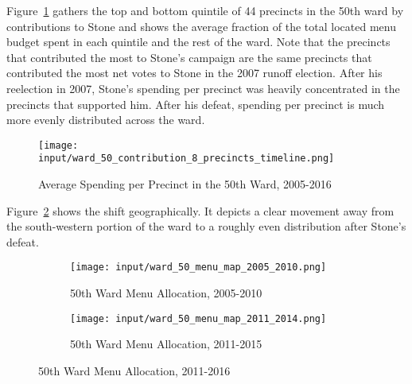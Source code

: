 Figure~\ref{fig:stone_spending_timeline} gathers the top and bottom quintile of 44 precincts in the 50th ward by contributions to Stone and shows the average fraction of the total located menu budget spent in each quintile and the rest of the ward.
Note that the precincts that contributed the most to Stone's campaign are the same precincts that contributed the most net votes to Stone in the 2007 runoff election.
After his reelection in 2007, Stone's spending per precinct was heavily concentrated in the precincts that supported him.
After his defeat, spending per precinct is much more evenly distributed across the ward.

\begin{figure}[H]
    \centering
    \texttt{[image: input/ward\_50\_contribution\_8\_precincts\_timeline.png]}
    \caption{Average Spending per Precinct in the 50th Ward, 2005-2016}
    \label{fig:stone_spending_timeline}
\end{figure}

Figure~\ref{fig:stone_spending_maps} shows the shift geographically.
It depicts a clear movement away from the south-western portion of the ward to a roughly even distribution after Stone's defeat.

\begin{figure}[H]
    \centering
    \begin{subfigure}[b]{0.45\textwidth} %
    \texttt{[image: input/ward\_50\_menu\_map\_2005\_2010.png]}
    \caption{50th Ward Menu Allocation, 2005-2010}
    \end{subfigure}
    \hfill %
    \begin{subfigure}[b]{0.45\textwidth}
    \texttt{[image: input/ward\_50\_menu\_map\_2011\_2014.png]}
    \caption{50th Ward Menu Allocation, 2011-2015}
    \end{subfigure}
    \caption{50th Ward Menu Allocation, 2011-2016}
    \label{fig:stone_spending_maps}
\end{figure}

